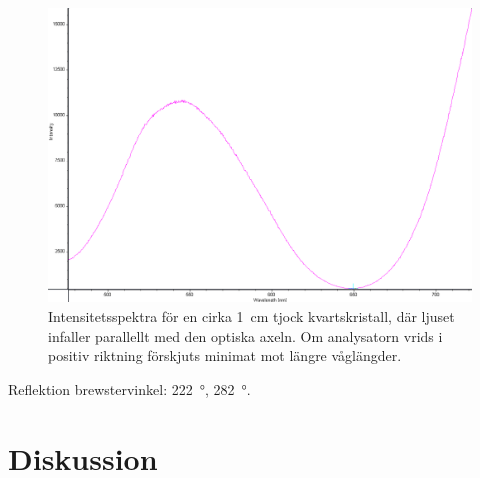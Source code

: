 \documentclass[a4paper]{article}
\begin{document}
\FloatBarrier
\begin{figure}[ht!]
	\centering
	\includegraphics[width=\linewidth]{data/spektra_aktiv2_inv}
	\caption{Intensitetsspektra för en cirka \SI{1}{\centi\m} tjock kvartskristall, där ljuset infaller parallellt med den optiska axeln. Om analysatorn vrids i positiv riktning förskjuts minimat mot längre våglängder.}
	\label{fig:}
\end{figure}
\FloatBarrier

Reflektion brewstervinkel: \SI{222}{\degree}, \SI{282}{\degree}.

\section{Diskussion}






 
 {}
 
\end{document}

